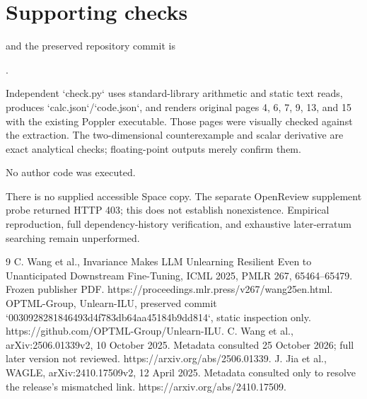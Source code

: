 \documentclass[10pt]{article}
\begin{document}
\section*{Supporting checks}
and the preserved repository commit is\par
.\par
Independent `check.py` uses standard-library arithmetic and static text reads, produces `calc.json`/`code.json`, and renders original pages 4, 6, 7, 9, 13, and 15 with the existing Poppler executable. Those pages were visually checked against the extraction. The two-dimensional counterexample and scalar derivative are exact analytical checks; floating-point outputs merely confirm them.\par
No author code was executed.\par
There is no supplied accessible Space copy. The separate OpenReview supplement probe returned HTTP 403; this does not establish nonexistence. Empirical reproduction, full dependency-history verification, and exhaustive later-erratum searching remain unperformed.\par
9 C. Wang et al., Invariance Makes LLM Unlearning Resilient Even to Unanticipated Downstream Fine-Tuning, ICML 2025, PMLR 267, 65464–65479. Frozen publisher PDF. https://proceedings.mlr.press/v267/wang25en.html. OPTML-Group, Unlearn-ILU, preserved commit `0030928281846493d4f783db64aa45184b9dd814`, static inspection only. https://github.com/OPTML-Group/Unlearn-ILU. C. Wang et al., arXiv:2506.01339v2, 10 October 2025. Metadata consulted 25 October 2026; full later version not reviewed. https://arxiv.org/abs/2506.01339. J. Jia et al., WAGLE, arXiv:2410.17509v2, 12 April 2025. Metadata consulted only to resolve the release’s mismatched link. https://arxiv.org/abs/2410.17509.\par
\end{document}
